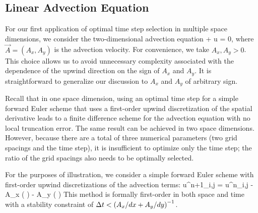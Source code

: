 \documentclass[oneeqnum,onefignum,onetabnum,onethmnum]{siamltex}
\begin{document}
\subsection{Linear Advection Equation}
For our first application of optimal time step selection in multiple
space dimensions, we consider the two-dimensional advection
equation
\beq
   +  \cdot \nabla u = 0,
  \label{eq:advection_eqn_2d}
\eeq
where $\vec{A} = (A_x, A_y)$ is the advection velocity.  For convenience, we 
take $A_x, A_y > 0$.  This choice allows us to avoid unnecessary complexity 
associated with the dependence of the upwind direction on the sign of $A_x$ 
and $A_y$.  It is straightforward to generalize our discussion to $A_x$ and 
$A_y$ of arbitrary sign.

Recall that in one space dimension, using an optimal time step for
a simple forward Euler scheme that uses a first-order upwind discretization
of the spatial derivative leads to a finite difference scheme for the 
advection equation with no local truncation error.  The same result can be 
achieved in two space dimensions.  However, because there are a total of three
numerical parameters (\ie two grid spacings and the time step), it is 
insufficient to optimize only the time step; the ratio of the grid 
spacings also needs to be optimally selected. 

For the purposes of illustration, we consider a simple forward Euler scheme 
with first-order upwind discretizations of the advection terms:
\beq
  u^{n+1}_{i,j} = u^{n}_{i,j}
  - A_x \dt \left(  \right)
  - A_y \dt \left(  \right)
  \label{eq:advection_eqn_2d_FD_scheme}
\eeq
This method is formally first-order in both space and time with a 
stability constraint of $\Delta t < \left( A_x/dx + A_y/dy \right)^{-1}$.
\end{document}
